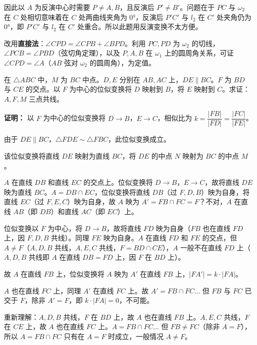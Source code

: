 \documentclass[12pt, a4paper]{ctexart}
\begin{document}
因此以 $A$ 为反演中心时需要 $P \neq A, B$，且反演后 $P' \neq B'$。问题在于 $PC$ 与 $\omega_2$ 在 $C$ 处相切意味着在 $C$ 处两曲线夹角为 $0°$，反演后 $P'C'$ 与 $l_2$ 在 $C'$ 处夹角仍为 $0°$，即 $P'C'$ 与 $l_2$ 在 $C'$ 处重合。所以此题用反演变换不太方便。

改用\textbf{直接法}：$\angle CPD = \angle CPB + \angle BPD$。利用 $PC, PD$ 为 $\omega_2$ 的切线，$\angle PCB = \angle PBD$（弦切角定理），以及 $P, A, B$ 在 $\omega_1$ 上的圆周角关系，可证 $\angle CPD = \angle A$（$AB$ 弦对 $\omega_2$ 的圆周角），为定值。

\begin{examplebox}[【例题10】位似旋转综合]
在 $\triangle ABC$ 中，$M$ 为 $BC$ 中点。$D, E$ 分别在 $AB, AC$ 上，$DE \parallel BC$。$F$ 为 $BD$ 与 $CE$ 的交点。以 $F$ 为中心的位似变换将 $D$ 映射到 $B$，将 $E$ 映射到 $C$。求证：$A, F, M$ 三点共线。
\end{examplebox}

\textbf{证明：} 以 $F$ 为中心的位似变换将 $D \to B$，$E \to C$，相似比为 $k = \dfrac{|FB|}{|FD|} = \dfrac{|FC|}{|FE|}$。

由于 $DE \parallel BC$，$\triangle FDE \sim \triangle FBC$，此位似变换成立。

该位似变换将直线 $DE$ 映射为直线 $BC$，将 $DE$ 的中点 $N$ 映射为 $BC$ 的中点 $M$。

$A$ 在直线 $DB$ 和直线 $EC$ 的交点上。位似变换将 $D \to B$，$E \to C$，故将直线 $DE$ 映为直线 $BC$。$A = DB \cap EC$，位似变换将直线 $DB$（过 $F, D, B$）映为自身，将直线 $EC$（过 $F, E, C$）映为自身，故 $A$ 映为 $A' = FB \cap FC = F$？不对，$A$ 在直线 $AB$（即 $DB$）和直线 $AC$（即 $EC$）上。

位似变换以 $F$ 为中心，将 $D \to B$，故将直线 $FD$ 映为自身（$FB$ 也在直线 $FD$ 上，因 $F, D, B$ 共线）。同理 $FE$ 映为自身。$A$ 在直线 $FD$ 和 $FE$ 的交点，但 $A \neq F$（$A, D, B$ 共线，$A, E, C$ 共线，$F = BD \cap CE$），$A$ 一般不在直线 $FD$ 上（$A, D, B$ 共线即 $A$ 在直线 $DB = FD$ 上，因 $F$ 在 $BD$ 上）。

故 $A$ 在直线 $FB$ 上，位似变换将 $A$ 映为 $A'$ 在直线 $FB$ 上，$|FA'| = k \cdot |FA|$。

$A$ 也在直线 $FC$ 上，同理 $A'$ 在直线 $FC$ 上。故 $A' = FB \cap FC$... 但 $FB$ 与 $FC$ 已交于 $F$，除非 $A' = F$，即 $k \cdot |FA| = 0$，不可能。

重新理解：$A, D, B$ 共线，$F$ 在 $BD$ 上，故 $A$ 也在直线 $FB$ 上。$A, E, C$ 共线，$F$ 在 $CE$ 上，故 $A$ 也在直线 $FC$ 上。$A = FB \cap FC$... 但 $FB \neq FC$（除非 $A = F$），所以 $A = FB \cap FC$ 只有在 $A = F$ 时成立，一般情况 $A \neq F$。
\end{document}
